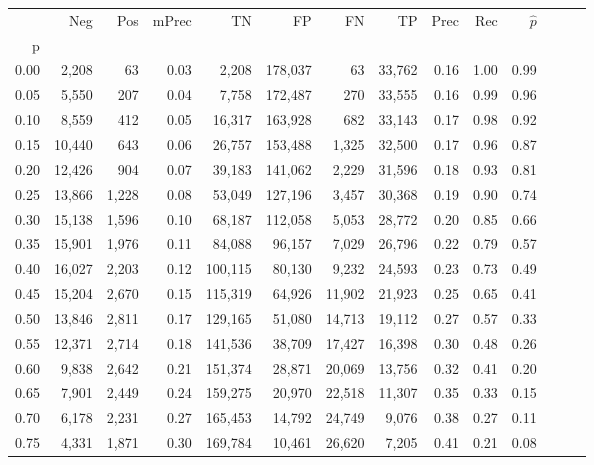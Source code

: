 \begin{tabular}{rrrrrrrrrrrrrr}
\toprule
{} &     Neg &    Pos & mPrec &       TN &       FP &      FN &      TP &  Prec &   Rec & $\hat{p}$ \\
p    &         &        &       &          &          &         &         &       &       &           \\
\midrule
0.00 &   2,208 &     63 &  0.03 &    2,208 &  178,037 &      63 &  33,762 &  0.16 &  1.00 &      0.99 \\
0.05 &   5,550 &    207 &  0.04 &    7,758 &  172,487 &     270 &  33,555 &  0.16 &  0.99 &      0.96 \\
0.10 &   8,559 &    412 &  0.05 &   16,317 &  163,928 &     682 &  33,143 &  0.17 &  0.98 &      0.92 \\
0.15 &  10,440 &    643 &  0.06 &   26,757 &  153,488 &   1,325 &  32,500 &  0.17 &  0.96 &      0.87 \\
0.20 &  12,426 &    904 &  0.07 &   39,183 &  141,062 &   2,229 &  31,596 &  0.18 &  0.93 &      0.81 \\
0.25 &  13,866 &  1,228 &  0.08 &   53,049 &  127,196 &   3,457 &  30,368 &  0.19 &  0.90 &      0.74 \\
0.30 &  15,138 &  1,596 &  0.10 &   68,187 &  112,058 &   5,053 &  28,772 &  0.20 &  0.85 &      0.66 \\
0.35 &  15,901 &  1,976 &  0.11 &   84,088 &   96,157 &   7,029 &  26,796 &  0.22 &  0.79 &      0.57 \\
0.40 &  16,027 &  2,203 &  0.12 &  100,115 &   80,130 &   9,232 &  24,593 &  0.23 &  0.73 &      0.49 \\
0.45 &  15,204 &  2,670 &  0.15 &  115,319 &   64,926 &  11,902 &  21,923 &  0.25 &  0.65 &      0.41 \\
0.50 &  13,846 &  2,811 &  0.17 &  129,165 &   51,080 &  14,713 &  19,112 &  0.27 &  0.57 &      0.33 \\
0.55 &  12,371 &  2,714 &  0.18 &  141,536 &   38,709 &  17,427 &  16,398 &  0.30 &  0.48 &      0.26 \\
0.60 &   9,838 &  2,642 &  0.21 &  151,374 &   28,871 &  20,069 &  13,756 &  0.32 &  0.41 &      0.20 \\
0.65 &   7,901 &  2,449 &  0.24 &  159,275 &   20,970 &  22,518 &  11,307 &  0.35 &  0.33 &      0.15 \\
0.70 &   6,178 &  2,231 &  0.27 &  165,453 &   14,792 &  24,749 &   9,076 &  0.38 &  0.27 &      0.11 \\
0.75 &   4,331 &  1,871 &  0.30 &  169,784 &   10,461 &  26,620 &   7,205 &  0.41 &  0.21 &      0.08 \\

\end{tabular}
